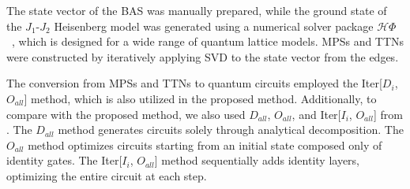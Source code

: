 \documentclass[12pt,dvipdfmx,twoside,openright]{report}
\begin{document}
The state vector of the BAS was manually prepared, while the ground state of the $J_1$-$J_2$ Heisenberg model was generated using a numerical solver package $\mathcal{H}\Phi$~\cite{hphi}, which is designed for a wide range of quantum lattice models. 
MPSs and TTNs were constructed by iteratively applying SVD to the state vector from the edges.

The conversion from MPSs and TTNs to quantum circuits employed the Iter[$D_i$, $O_{all}$] method, which is also utilized in the proposed method.
Additionally, to compare with the proposed method, we also used $D_{all}$, $O_{all}$, and Iter[$I_i$, $O_{all}$] from \cite{mpsdecomp}.
The $D_{all}$ method generates circuits solely through analytical decomposition.
The $O_{all}$ method optimizes circuits starting from an initial state composed only of identity gates.
The Iter[$I_i$, $O_{all}$] method sequentially adds identity layers, optimizing the entire circuit at each step.
\end{document}
